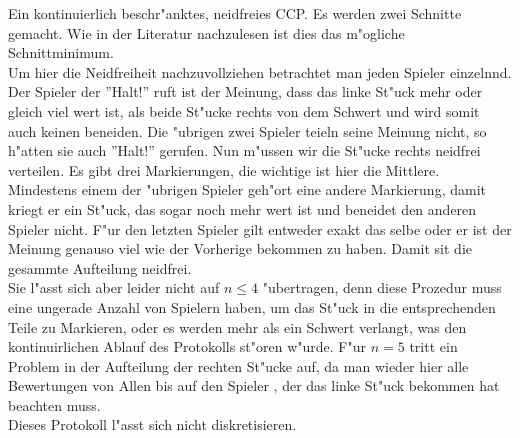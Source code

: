 \documentclass[11pt, a4paper, twoside]{article}
\numberwithin{equation}{section}
\begin{document}
\newline
\newline
\newline
Ein kontinuierlich beschr"anktes, neidfreies CCP. Es werden zwei Schnitte gemacht. Wie in der Literatur nachzulesen ist dies das m"ogliche Schnittminimum.\\ Um hier die Neidfreiheit nachzuvollziehen betrachtet man jeden Spieler einzelnnd. Der Spieler der ''Halt!'' ruft ist der Meinung, dass das linke St"uck mehr oder gleich viel wert ist, als beide St"ucke rechts von dem Schwert und wird somit auch keinen beneiden. Die "ubrigen zwei Spieler teieln seine Meinung nicht, so h"atten sie auch ''Halt!'' gerufen. Nun m"ussen wir die St"ucke rechts neidfrei verteilen. Es gibt drei Markierungen, die wichtige ist hier die Mittlere. Mindestens einem der "ubrigen Spieler geh"ort eine andere Markierung, damit kriegt er ein St"uck, das sogar noch mehr wert ist und beneidet den anderen Spieler nicht. F"ur den letzten Spieler gilt entweder exakt das selbe oder er ist der Meinung genauso viel wie der Vorherige bekommen zu haben. Damit sit die gesammte Aufteilung neidfrei.\\
Sie l"asst sich aber leider nicht auf $n \leq 4$ "ubertragen, denn diese Prozedur muss eine ungerade Anzahl von Spielern haben, um das St"uck in die entsprechenden Teile zu Markieren, oder es werden mehr als ein Schwert verlangt, was den kontinuirlichen Ablauf des Protokolls st"oren w"urde. F"ur $n=5$ tritt ein Problem in der Aufteilung der rechten St"ucke auf, da man wieder hier alle Bewertungen von Allen bis auf den Spieler , der das linke  St"uck bekommen hat beachten muss.\\ Dieses Protokoll l"asst sich nicht diskretisieren.\\
\newline
\end{document}
